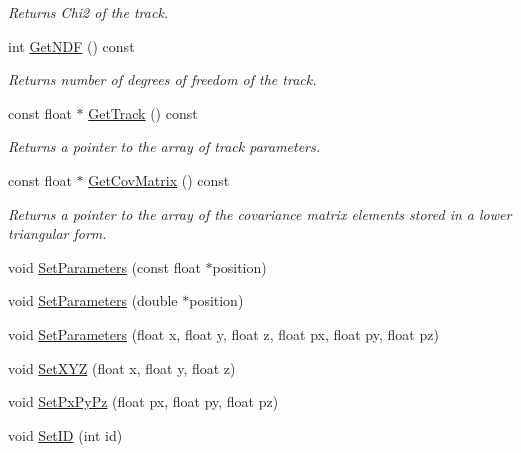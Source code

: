 \begin{DoxyCompactItemize}
\begin{DoxyCompactList}\small\item\em Returns Chi2 of the track. \end{DoxyCompactList}\item 
int \hyperlink{classKFPTrack_a88971322ae4f8eec3be97aecab4fdea9}{Get\+N\+DF} () const \hypertarget{classKFPTrack_a88971322ae4f8eec3be97aecab4fdea9}{}\label{classKFPTrack_a88971322ae4f8eec3be97aecab4fdea9}

\begin{DoxyCompactList}\small\item\em Returns number of degrees of freedom of the track. \end{DoxyCompactList}\item 
const float $\ast$ \hyperlink{classKFPTrack_a9bd864f517bb22ac8374017fe57c1eae}{Get\+Track} () const \hypertarget{classKFPTrack_a9bd864f517bb22ac8374017fe57c1eae}{}\label{classKFPTrack_a9bd864f517bb22ac8374017fe57c1eae}

\begin{DoxyCompactList}\small\item\em Returns a pointer to the array of track parameters. \end{DoxyCompactList}\item 
const float $\ast$ \hyperlink{classKFPTrack_ac630ae470f31356547bb7d57cc0b151a}{Get\+Cov\+Matrix} () const \hypertarget{classKFPTrack_ac630ae470f31356547bb7d57cc0b151a}{}\label{classKFPTrack_ac630ae470f31356547bb7d57cc0b151a}

\begin{DoxyCompactList}\small\item\em Returns a pointer to the array of the covariance matrix elements stored in a lower triangular form. \end{DoxyCompactList}\item 
void \hyperlink{classKFPTrack_aa139b096b5a3ae8d89144021a9edae5e}{Set\+Parameters} (const float $\ast$position)
\item 
void \hyperlink{classKFPTrack_a609e11cfc6b3d20fb9ecb7f80b8b34c5}{Set\+Parameters} (double $\ast$position)
\item 
void \hyperlink{classKFPTrack_a34415422f378a08eda2d855870296fa2}{Set\+Parameters} (float x, float y, float z, float px, float py, float pz)
\item 
void \hyperlink{classKFPTrack_a2b526ac60d6cc17e216674dfbbdec969}{Set\+X\+YZ} (float x, float y, float z)
\item 
void \hyperlink{classKFPTrack_a69cac0d9ff19a76f15ddac24e7f30da4}{Set\+Px\+Py\+Pz} (float px, float py, float pz)
\item 
void \hyperlink{classKFPTrack_a0d4b6c1f619ab583e490b5fce4a22d3f}{Set\+ID} (int id)\hypertarget{classKFPTrack_a0d4b6c1f619ab583e490b5fce4a22d3f}{}\label{classKFPTrack_a0d4b6c1f619ab583e490b5fce4a22d3f}


\end{DoxyCompactItemize}
